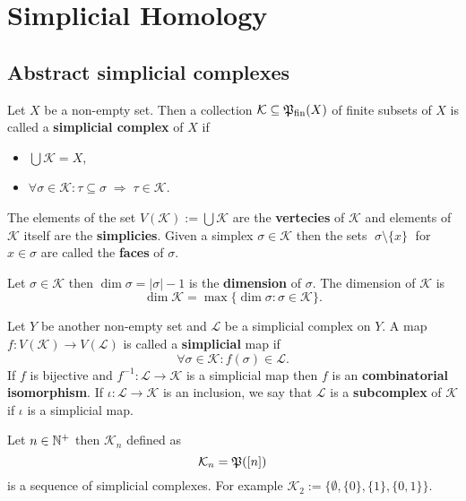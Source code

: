 \section{Simplicial Homology}

\subsection{Abstract simplicial complexes}

\begin{defin}
    Let $X$ be a non-empty set. Then a collection $\mathcal{K} \subseteq \mathfrak{P}_{\text{fin}}(X)$ of finite subsets of $X$ is called a 
    \textbf{simplicial complex} of $X$ if
    \begin{itemize}
        \item $\bigcup \mathcal{K} = X$,
        \item $\forall \sigma\in\mathcal{K} \colon \tau \subseteq \sigma \; \Rightarrow \; \tau \in \mathcal{K}$.
    \end{itemize}
    The elements of the set $V(\mathcal{K}) := \bigcup \mathcal{K}$ are the \textbf{vertecies} of $\mathcal{K}$ and
    elements of $\mathcal{K}$ itself are the \textbf{simplicies}. Given a simplex $\sigma \in \mathcal{K}$ then the sets
    $\; \sigma \setminus \{x\} \;$ for $x \in \sigma$ are called the \textbf{faces} of $\sigma$.

    Let $\sigma \in \mathcal{K}$ then $\dim \sigma = |\sigma| -1$ is the \textbf{dimension} of $\sigma$. The dimension of $\mathcal{K}$ is
    \begin{equation*}
      \dim \mathcal{K} = \max\{\dim \sigma\colon \sigma \in \mathcal{K}\}.
    \end{equation*} 
    
    Let $Y$ be another non-empty set and $\mathcal{L}$ be a simplicial complex on $Y$. A map $f: V(\mathcal{K}) \to V(\mathcal{L})$ is called 
    a \textbf{simplicial} map if
    \begin{equation*}
        \forall \sigma \in \mathcal{K}\colon f(\sigma) \in \mathcal{L}.
    \end{equation*}
    If $f$ is bijective and $f^{-1}\colon \mathcal{L} \to \mathcal{K}$ is a simplicial map then $f$ is an \textbf{combinatorial isomorphism}.
    If $\iota\colon \mathcal{L} \to \mathcal{K}$ is an inclusion, we say that $\mathcal{L}$ is a \textbf{subcomplex} of $\mathcal{K}$ if $\iota$ is a simplicial map.
\end{defin}

\begin{ex}\label{ex:seqcom}
  Let $n \in \mathbb{N}^+$ then $\mathcal{K}_n$ defined as
  \begin{equation*}
    \mathcal{K}_n = \mathfrak{P}([n])
  \end{equation*}
  is a sequence of simplicial complexes. For example $\mathcal{K}_2 := \{\emptyset, \{0\}, \{1\}, \{0,1\}\}$.
\end{ex}


